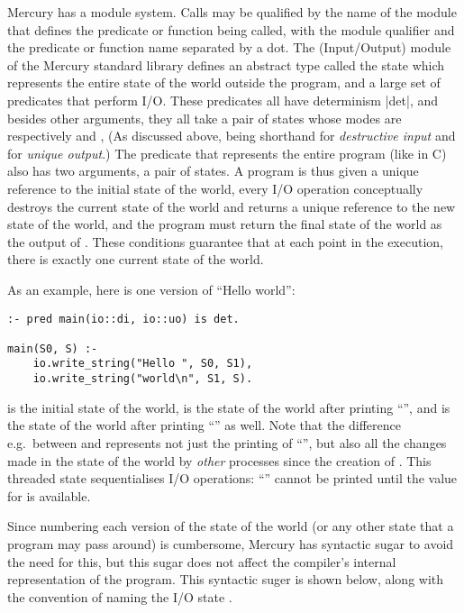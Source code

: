 Mercury has a module system.
Calls may be qualified by the name of the module
that defines the predicate or function being called,
with the module qualifier and the predicate or function name
separated by a dot.
The \io (Input/Output) module of the Mercury standard library
defines an abstract type called the \io state
which represents the entire state of the world outside the program,
and a large set of predicates that perform I/O.
These predicates all have determinism \code|det|,
and besides other arguments,
they all take a pair of \io states
whose modes are respectively \di and \uo,
(As discussed above, \di being shorthand for \emph{destructive input}
and \uo for \emph{unique output}.)
The  predicate that represents the entire program
(like  in C)
also has two arguments, a  pair of \io states.
A program is thus given
a unique reference to the initial state of the world,
every I/O operation conceptually destroys the current state of the world
and returns a unique reference to the new state of the world,
and the program must return the final state of the world
as the output of .
These conditions guarantee that at each point in the execution,
there is exactly one current state of the world.

As an example, here is one version of ``Hello world'':

\begin{verbatim}
:- pred main(io::di, io::uo) is det.

main(S0, S) :-
    io.write_string("Hello ", S0, S1),
    io.write_string("world\n", S1, S).
\end{verbatim}

\noindent
 is the initial state of the world,
 is the state of the world after printing ``'',
and  is the state of the world
after printing ``'' as well.
Note that the difference e.g.\ between  and 
represents not just the printing of ``'',
but also all the changes made in the state of the world
by \emph{other} processes since the creation of .
This threaded state sequentialises I/O operations:
``'' cannot be printed until the value for 
is available.

Since numbering each version of the state of the world
(or any other state that a program may pass around) is cumbersome,
Mercury has syntactic sugar to avoid the need for this,
but this sugar does not affect
the compiler's internal representation of the program.
This syntactic suger is shown below, along with the convention of naming
the I/O state .

